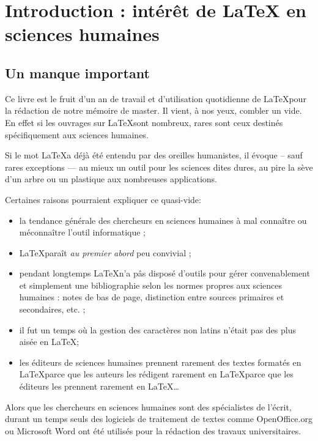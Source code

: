 \chapter[Introduction]{Introduction : intérêt de \LaTeX{} en sciences humaines}

\section{Un manque important}

Ce livre est le fruit d'un an de travail et d'utilisation quotidienne de \LaTeX pour la rédaction de notre mémoire de master. Il vient, à nos yeux,  combler un vide. En effet si les ouvrages sur \LaTeX sont nombreux, rares sont ceux destinés  spécifiquement aux sciences humaines. 

Si le mot \LaTeX a déjà été entendu par des oreilles humanistes, il évoque -- sauf rares exceptions --- au mieux un outil pour les sciences dites dures, au pire la sève d'un arbre ou un plastique aux nombreuses applications. 

Certaines raisons pourraient expliquer ce quasi-vide:
\begin{itemize}
\item la tendance générale des chercheurs en sciences humaines à mal connaître ou méconnaître l'outil informatique ;
\item \LaTeX paraît \emph{au premier abord} peu convivial ;
\item pendant longtemps \LaTeX n'a pâs disposé d'outils pour gérer convenablement et simplement une bibliographie selon les normes propres aux sciences humaines : notes de bas de page, distinction entre sources primaires et secondaires, etc. ;
\item il fut un temps où la gestion des caractères non latins n'était pas des plus aisée en \LaTeX ;
\item les éditeurs de sciences humaines prennent rarement des textes formatés en \LaTeX parce que les auteurs les rédigent rarement en \LaTeX parce que les éditeurs les prennent rarement en \LaTeX \ldots
\end{itemize}

Alors que les chercheurs en sciences humaines sont des spécialistes de l'écrit, durant un temps seuls des logiciels de traitement de textes comme OpenOffice.org ou Microsoft Word ont été utilisés pour la rédaction des travaux universitaires.

